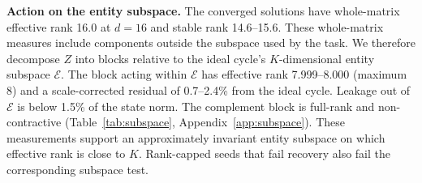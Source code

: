 \textbf{Action on the entity subspace.} The converged solutions have
whole-matrix effective rank 16.0 at $d{=}16$ and stable rank
14.6--15.6. These whole-matrix measures include components outside
the subspace used by the task.
We therefore decompose $Z$ into blocks relative to the ideal cycle's
$K$-dimensional entity subspace $\mathcal{E}$. The block acting within
$\mathcal{E}$ has effective rank 7.999--8.000 (maximum 8) and a
scale-corrected residual of 0.7--2.4\% from the ideal cycle. Leakage
out of $\mathcal{E}$ is below 1.5\% of the state norm. The complement
block is full-rank and non-contractive
(Table~\ref{tab:subspace}, Appendix~\ref{app:subspace}).
These measurements support an approximately invariant entity
subspace on which effective rank is close to $K$. Rank-capped seeds
that fail recovery also fail the corresponding subspace test.

